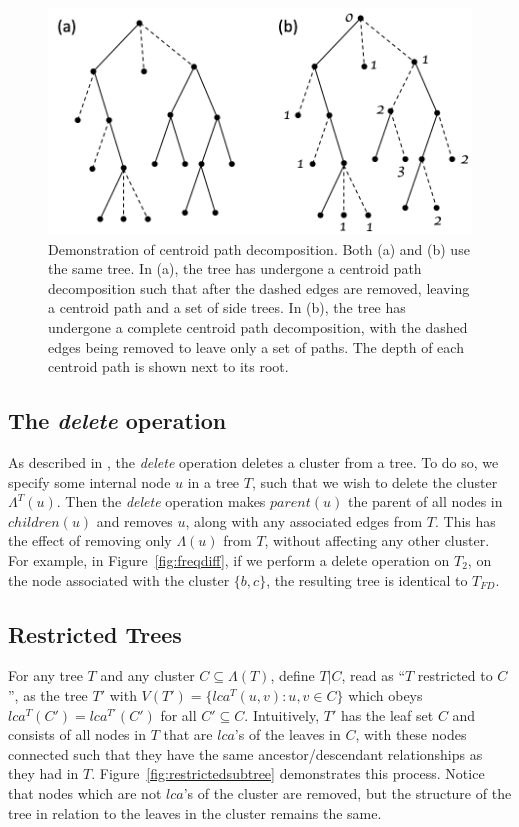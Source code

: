 \documentclass{article}
\newcommand{\leafset}{\Lambda}
\begin{document}
    \begin{figure}[ht]
        \includegraphics[scale=0.5]{centroid}
        \centering
        \caption{Demonstration of centroid path decomposition. Both (a) and (b) use the same tree. In (a), the tree has undergone a centroid path decomposition such that after the dashed edges are removed, leaving a centroid path and a set of side trees. In (b), the tree has undergone a complete centroid path decomposition, with the dashed edges being removed to leave only a set of paths. The depth of each centroid path is shown next to its root.}
        \label{fig:centroid}
    \end{figure}

    \subsection{The \textit{delete} operation}
    \label{subsec:delete}

    As described in \cite{jansson2018algorithms}, the \textit{delete} operation deletes a cluster from a tree. To do so, we specify some internal node $u$ in a tree $T$, such that we wish to delete the cluster $\leafset^{T}(u)$. Then the \textit{delete} operation makes $parent(u)$ the parent of all nodes in $children(u)$ and removes $u$, along with any associated edges from $T$. This has the effect of removing only $\leafset(u)$ from $T$, without affecting any other cluster. For example, in Figure~\ref{fig:freqdiff}, if we perform a delete operation on $T_2$, on the node associated with the cluster $\{b, c\}$, the resulting tree is identical to $T_{FD}$.

    \subsection{Restricted Trees}
    For any tree $T$ and any cluster $C \subseteq \leafset(T)$, define $T|C$, read as ``$T$ restricted to $C$'', as the tree $T'$ with $V(T') = \{lca^T(u, v) : u, v \in C\}$ which obeys $lca^T(C') = lca^{T'}(C')$ for all $C' \subseteq C$. Intuitively, $T'$ has the leaf set $C$ and consists of all nodes in $T$ that are $lca$'s of the leaves in $C$, with these nodes connected such that they have the same ancestor/descendant relationships as they had in $T$. Figure~\ref{fig:restrictedsubtree} demonstrates this process. Notice that nodes which are not $lca$'s of the cluster are removed, but the structure of the tree in relation to the leaves in the cluster remains the same.
\end{document}
